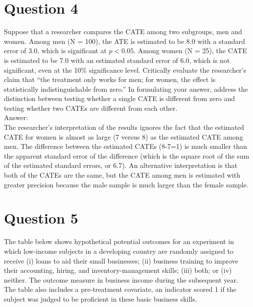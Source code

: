 \documentclass[11pt,notitlepage]{article}\usepackage[]{graphicx}\usepackage[]{color}
\begin{document}
\section*{Question 4}
Suppose that a researcher compares the CATE among two subgroups, men and women. Among men (N = 100), the ATE is estimated to be 8.0 with a standard error of 3.0, which is significant at $p<0.05$. Among women (N = 25), the CATE is estimated to be 7.0 with an estimated standard error of 6.0, which is not significant, even at the 10\% significance level. Critically evaluate the researcher's claim that ``the treatment only works for men; for women, the effect is statistically indistinguishable from zero.'' In formulating your answer, address the distinction between testing whether a single CATE is different from zero and testing whether two CATEs are different from each other. \\
Answer:\\
The researcher's interpretation of the results ignores the fact that the estimated CATE for women is almost as large (7 versus 8) as the estimated CATE among men. The difference between the estimated CATEs (8-7=1) is much smaller than the apparent standard error of the difference (which is the square root of the sum of the estimated standard errors, or 6.7). An alternative interpretation is that both of the CATEs are the same, but the CATE among men is estimated with greater precision because the male sample is much larger than the female sample.

\section*{Question 5}
The table below shows hypothetical potential outcomes for an experiment in which low-income subjects in a developing country are randomly assigned to receive (i) loans to aid their small businesses; (ii) business training to improve their accounting, hiring, and inventory-management skills; (iii) both; or (iv) neither. The outcome measure in business income during the subsequent year. The table also includes a pre-treatment covariate, an indicator scored 1 if the subject was judged to be proficient in these basic business skills.
\end{document}
